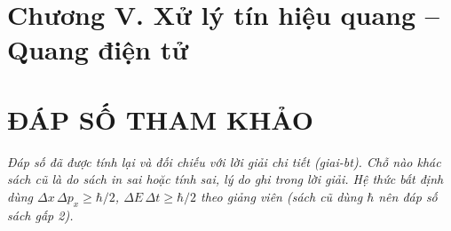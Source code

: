 \documentclass[11pt,a4paper]{article}
\begin{document}

\vspace{0.35cm}




\clearpage
\section*{Chương V. Xử lý tín hiệu quang -- Quang điện tử}


\vspace{0.35cm}


\vspace{0.35cm}


\vspace{0.35cm}


\vspace{0.35cm}


\vspace{0.35cm}


\vspace{0.35cm}




\begingroup
\setlength{\multicolsep}{4pt}
\titlespacing*{\section}{0pt}{2pt}{4pt}
\setlength{\parskip}{2pt}

\clearpage
\section*{ĐÁP SỐ THAM KHẢO}
\textit{Đáp số đã được tính lại và đối chiếu với lời giải chi tiết (giai-bt). Chỗ nào khác sách cũ là do sách in sai hoặc tính sai, lý do ghi trong lời giải. Hệ thức bất định dùng $\Delta x\,\Delta p_x\ge\hbar/2$, $\Delta E\,\Delta t\ge\hbar/2$ theo giảng viên (sách cũ dùng $\hbar$ nên đáp số sách gấp 2).}
\end{document}
